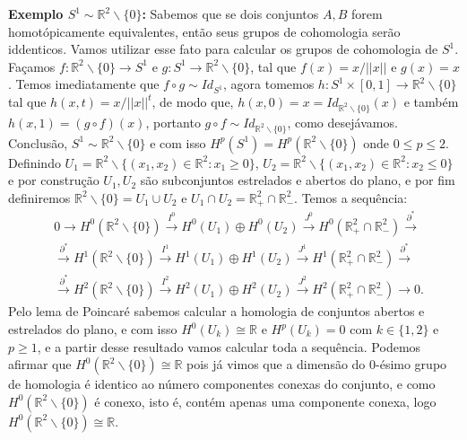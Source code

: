 \documentclass{article}
\begin{document}
	\vspace{2 mm}
	\textbf{Exemplo $S^{1} \sim \mathbb{R}^{2} \backslash \{0\}$:} Sabemos que se dois conjuntos $A, B$ forem homotópicamente equivalentes, então seus grupos de cohomologia serão iddenticos. Vamos utilizar esse fato para calcular os grupos de cohomologia de $S^{1}$. Façamos $f: \mathbb{R}^{2} \backslash \{0\} \to S^{1}$ e $g: S^{1} \to \mathbb{R}^{2} \backslash \{0\}$, tal que $f(x) = x/||x||$ e $g(x) = x$. Temos imediatamente que $f \circ g \sim Id_{S^{1}}$, agora tomemos $h: S^{1} \times [0,1] \to \mathbb{R}^{2} \backslash \{0\}$ tal que 
	$h(x,t) = x/||x||^{t}$, de modo que, $h(x, 0) = x = Id_{\mathbb{R}^{2} \backslash \{0\}}(x)$ e também $h(x, 1) = (g \circ f)(x)$, portanto $g \circ f \sim Id_{\mathbb{R}^{2} \backslash \{0\}}$, como desejávamos. Conclusão, $S^{1} \sim \mathbb{R}^{2} \backslash \{0\}$ e com isso $H^{p}(S^{1}) = H^{p}(\mathbb{R}^{2} \backslash \{0\})$ onde $0 \leq p \leq 2$.
	Definindo $U_{1} = \mathbb{R}^{2} \backslash \{(x_{1}, x_{2}) \in \mathbb{R}^{2} : x_{1} \geq 0 \}$, $U_{2} = \mathbb{R}^{2} \backslash \{(x_{1}, x_{2}) \in \mathbb{R}^{2} : x_{2} \leq 0 \}$ e por construção $U_{1}, U_{2}$ são subconjuntos estrelados e abertos do plano, e por fim definiremos $\mathbb{R}^{2} \backslash \{0\} = U_{1} \cup U_{2}$ e $U_{1}\cap U_{2} = \mathbb{R}^{2}_{+} \cap \mathbb{R}^{2}_{-}$. Temos a sequência:
	$$
	\begin{aligned}
	& 0 \to H^{0}(\mathbb{R}^{2} \backslash \{0\} ) \xrightarrow{I^{0}} H^{0}(U_{1}) \oplus H^{0}(U_{2}) \xrightarrow{J^{0}} H^{0}(\mathbb{R}^{2}_{+} \cap \mathbb{R}^{2}_{-}) \xrightarrow{\partial^{*}} 
	\\
	&\xrightarrow{\partial^{*}} H^{1}(\mathbb{R}^{2} \backslash \{0\} ) \xrightarrow{I^{1}} H^{1}(U_{1}) \oplus H^{1}(U_{2}) \xrightarrow{J^{1}} H^{1}(\mathbb{R}^{2}_{+} \cap \mathbb{R}^{2}_{-}) \xrightarrow{\partial^{*}} 
	\\
	&\xrightarrow{\partial^{*}} H^{2}(\mathbb{R}^{2} \backslash \{0\} ) \xrightarrow{I^{2}} H^{2}(U_{1}) \oplus H^{2}(U_{2}) \xrightarrow{J^{2}} H^{2}(\mathbb{R}^{2}_{+} \cap \mathbb{R}^{2}_{-}) \to 0.
	\end{aligned}
	$$
	Pelo lema de Poincaré sabemos calcular a homologia de conjuntos abertos e estrelados do plano, e com isso $H^{0}(U_{k}) \cong \mathbb{R}$ e $H^{p}(U_{k}) = 0$ com $k \in \{1,2\}$ e $p\geq 1$, e a partir desse resultado vamos calcular toda a sequência. Podemos afirmar que $H^{0}(\mathbb{R}^{2} \backslash \{0\}) \cong \mathbb{R}$ pois já vimos que a dimensão do 0-ésimo grupo de homologia é identico ao número componentes conexas do conjunto, e como $H^{0}(\mathbb{R}^{2} \backslash \{0\} )$ é conexo, isto é, contém apenas uma componente conexa, logo $H^{0}(\mathbb{R}^{2} \backslash \{0\}) \cong \mathbb{R}$. 
	
\end{document}
